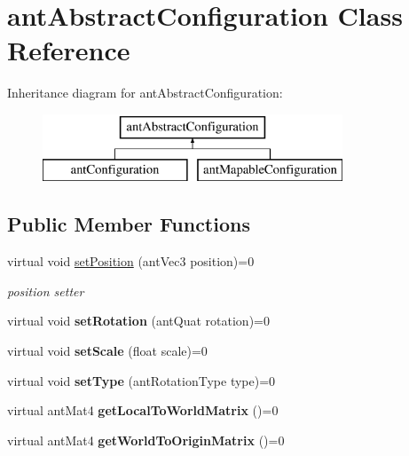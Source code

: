 \hypertarget{classant_abstract_configuration}{\section{ant\+Abstract\+Configuration Class Reference}
\label{classant_abstract_configuration}
}
Inheritance diagram for ant\+Abstract\+Configuration\+:\begin{figure}[H]
\begin{center}
\leavevmode
\includegraphics[height=2.000000cm]{classant_abstract_configuration}
\end{center}
\end{figure}
\subsection*{Public Member Functions}
\begin{DoxyCompactItemize}
\item 
virtual void \hyperlink{classant_abstract_configuration_a1c5fd57da800e0b5e0d6cd5fff2c6ca6}{set\+Position} (ant\+Vec3 position)=0
\begin{DoxyCompactList}\small\item\em position setter \end{DoxyCompactList}\item 
\hypertarget{classant_abstract_configuration_adef1a8c5835ba8af69a9d261e05c36d6}{virtual void {\bfseries set\+Rotation} (ant\+Quat rotation)=0}\label{classant_abstract_configuration_adef1a8c5835ba8af69a9d261e05c36d6}

\item 
\hypertarget{classant_abstract_configuration_a8ad082c6948d09574ee73655f2b4cfdb}{virtual void {\bfseries set\+Scale} (float scale)=0}\label{classant_abstract_configuration_a8ad082c6948d09574ee73655f2b4cfdb}

\item 
\hypertarget{classant_abstract_configuration_a642872fabf172c8cf01e13b3ca41681d}{virtual void {\bfseries set\+Type} (ant\+Rotation\+Type type)=0}\label{classant_abstract_configuration_a642872fabf172c8cf01e13b3ca41681d}

\item 
\hypertarget{classant_abstract_configuration_aa3aa7cfbaef8bd3aada4c67a64a31160}{virtual ant\+Mat4 {\bfseries get\+Local\+To\+World\+Matrix} ()=0}\label{classant_abstract_configuration_aa3aa7cfbaef8bd3aada4c67a64a31160}

\item 
\hypertarget{classant_abstract_configuration_a46effbdd3ec429e1616c4edcdff95fb8}{virtual ant\+Mat4 {\bfseries get\+World\+To\+Origin\+Matrix} ()=0}\label{classant_abstract_configuration_a46effbdd3ec429e1616c4edcdff95fb8}

\end{DoxyCompactItemize}



